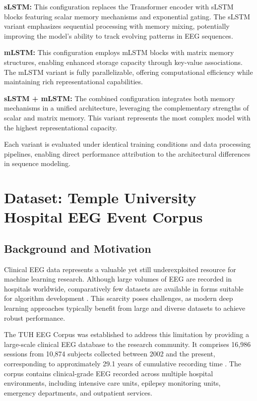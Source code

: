\textbf{sLSTM:} This configuration replaces the Transformer encoder with \ac{sLSTM} blocks featuring scalar memory mechanisms and exponential gating. The \ac{sLSTM} variant emphasizes sequential processing with memory mixing, potentially improving the model's ability to track evolving patterns in \ac{EEG} sequences.

\textbf{mLSTM:} This configuration employs \ac{mLSTM} blocks with matrix memory structures, enabling enhanced storage capacity through key-value associations. The \ac{mLSTM} variant is fully parallelizable, offering computational efficiency while maintaining rich representational capabilities.

\textbf{sLSTM + mLSTM:} The combined configuration integrates both memory mechanisms in a unified architecture, leveraging the complementary strengths of scalar and matrix memory. This variant represents the most complex model with the highest representational capacity.

Each variant is evaluated under identical training conditions and data processing pipelines, enabling direct performance attribution to the architectural differences in sequence modeling.


\section{Dataset: Temple University Hospital EEG Event Corpus}
\label{sec:dataset}

\subsection{Background and Motivation}
\label{sec:dataset_background}

Clinical \ac{EEG} data represents a valuable yet still underexploited resource for machine learning research. Although large volumes of \ac{EEG} are recorded in hospitals worldwide, comparatively few datasets are available in forms suitable for algorithm development \cite{obeid2016temple}. This scarcity poses challenges, as modern deep learning approaches typically benefit from large and diverse datasets to achieve robust performance.

The \ac{TUH} \ac{EEG} Corpus was established to address this limitation by providing a large-scale clinical \ac{EEG} database to the research community. It comprises 16,986 sessions from 10,874 subjects collected between 2002 and the present, corresponding to approximately 29.1 years of cumulative recording time \cite{obeid2016temple}. The corpus contains clinical-grade \ac{EEG} recorded across multiple hospital environments, including intensive care units, epilepsy monitoring units, emergency departments, and outpatient services.

